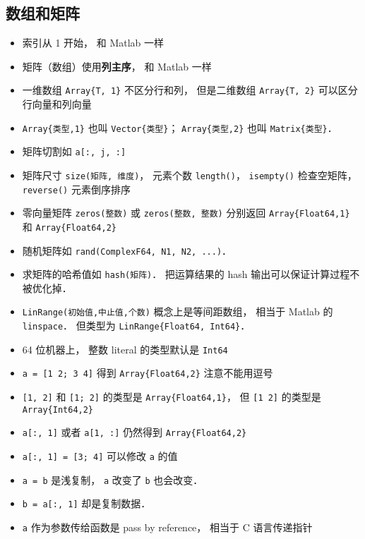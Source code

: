 \subsection{数组和矩阵}
\begin{itemize}
\item 索引从 1 开始， 和 Matlab 一样
\item 矩阵（数组）使用\textbf{列主序}， 和 Matlab 一样
\item 一维数组 \verb|Array{T, 1}| 不区分行和列， 但是二维数组 \verb|Array{T, 2}| 可以区分行向量和列向量
\item \verb|Array{类型,1}| 也叫 \verb|Vector{类型}|； \verb|Array{类型,2}| 也叫 \verb|Matrix{类型}|．
\item 矩阵切割如 \verb|a[:, j, :]|
\item 矩阵尺寸 \verb|size(矩阵, 维度)|， 元素个数 \verb|length()|， \verb|isempty()| 检查空矩阵， \verb|reverse()| 元素倒序排序
\item 零向量矩阵 \verb|zeros(整数)| 或 \verb|zeros(整数, 整数)| 分别返回 \verb|Array{Float64,1}| 和 \verb|Array{Float64,2}|
\item 随机矩阵如 \verb|rand(ComplexF64, N1, N2, ...)|．
\item 求矩阵的哈希值如 \verb|hash(矩阵)|． 把运算结果的 hash 输出可以保证计算过程不被优化掉．
\item \verb|LinRange(初始值,中止值,个数)| 概念上是等间距数组， 相当于 Matlab 的 \verb|linspace|． 但类型为 \verb|LinRange{Float64, Int64}|．
\item 64 位机器上， 整数 literal 的类型默认是 \verb|Int64|
\item \verb|a = [1 2; 3 4]| 得到 \verb|Array{Float64,2}| 注意不能用逗号
\item \verb|[1, 2]| 和 \verb|[1; 2]| 的类型是 \verb|Array{Float64,1}|， 但 \verb|[1 2]| 的类型是 \verb|Array{Int64,2}|
\item \verb|a[:, 1]| 或者 \verb|a[1, :]| 仍然得到 \verb|Array{Float64,2}|
\item \verb|a[:, 1] = [3; 4]| 可以修改 \verb|a| 的值
\item \verb|a = b| 是浅复制， \verb|a| 改变了 \verb|b| 也会改变．
\item \verb|b = a[:, 1]| 却是复制数据．
\item \verb|a| 作为参数传给函数是 pass by reference， 相当于 C 语言传递指针
\end{itemize}


